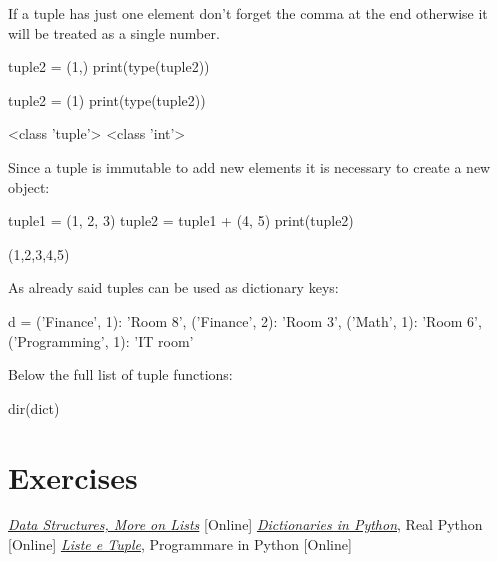 If a tuple has just one element don't forget the comma at the end otherwise it will be treated as a single number.

\begin{ipython}
tuple2 = (1,)
print(type(tuple2))

tuple2 = (1)
print(type(tuple2))
\end{ipython}
\begin{ioutput}
<class 'tuple'>
<class 'int'>
\end{ioutput}

Since a tuple is immutable to add new elements it is necessary to create a new object:

\begin{ipython}
tuple1 = (1, 2, 3)
tuple2 = tuple1 + (4, 5)
print(tuple2)
\end{ipython}
\begin{ioutput}
(1,2,3,4,5)
\end{ioutput}

As already said tuples can be used as dictionary keys:

\begin{ipython}
d = {
	('Finance', 1): 'Room 8',
	('Finance', 2): 'Room 3',
	('Math', 1): 'Room 6',
	('Programming', 1): 'IT room'}
\end{ipython}

Below the full list of tuple functions:
\begin{ipython}
dir(dict)
\end{ipython}
\begin{ioutput}
\end{ioutput}

\section*{Exercises}


\begin{thebibliography}{9}
 \href{https://docs.python.org/3/tutorial/datastructures.html}{\emph{Data Structures, More on Lists}} [Online]
 \href{https://realpython.com/python-dicts/}{\emph{Dictionaries in Python}}, Real Python [Online]
 \href{https://www.programmareinpython.it/video-corso-python-base/14-liste-e-tuple/}{\emph{Liste e Tuple}}, Programmare in Python [Online]
\end{thebibliography}

